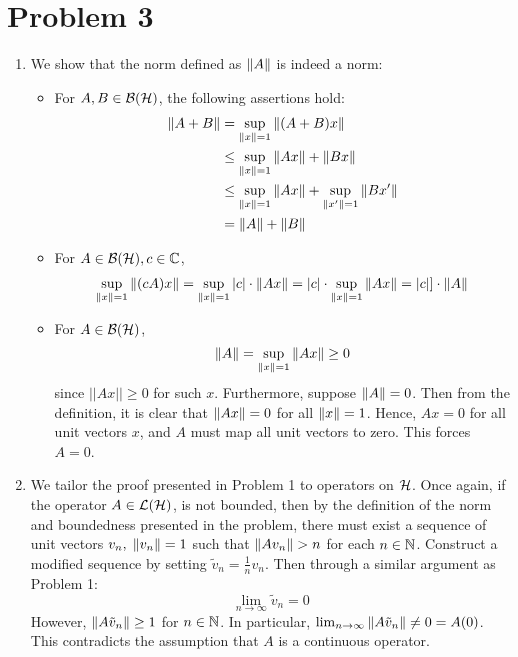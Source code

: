 \documentclass[12pt]{article}%
\begin{document}
\section*{Problem 3}
\begin{enumerate}[i]
  \item We show that the norm defined as $\norm{A}$ is indeed a norm:
  \begin{itemize}
    \item For $A,B \in \mathcal{B}(\mathcal{H})$, the following assertions hold:
    \begin{align*}
      \norm{A + B} & = \sup_{\norm{x} = 1} \norm{(A+B)x} \\
      & \leq \sup_{\norm{x} = 1} \norm{Ax} + \norm{Bx}\\
       & \leq \sup_{\norm{x} = 1} \norm{Ax} + \sup_{\norm{x'} = 1} \norm{Bx'} \\
       & = \norm{A} + \norm{B}
    \end{align*}
    \item For $A \in \mathcal{B}(\mathcal{H}), c \in {\mathbb{C}}$,
    \begin{align*}
      \sup_{\norm{x} = 1} \norm{(cA)x} = \sup_{\norm{x} = 1} \abs{c}\cdot \norm{Ax} = \abs{c}\cdot \sup_{\norm{x} = 1} \norm{Ax} = \abs{c}]\cdot \norm{A}
    \end{align*}

    \item  For $A \in \mathcal{B}(\mathcal{H})$,
    \[ \norm{A} = \sup_{\norm{x} = 1} \norm{Ax} \geq 0  \] since $||Ax|| \geq 0$ for such $x$. Furthermore, suppose $\norm{A} = 0$. Then from the definition, it is clear that $\norm{Ax} = 0$ for all $\norm{x} = 1$. Hence, $Ax = 0$ for all unit vectors $x$, and $A$ must map all unit vectors to zero. This forces $A = 0$.
  \end{itemize}

  \item We tailor the proof presented in Problem 1 to operators on $\mathcal{H}$. Once again, if the operator $A \in \mathcal{L}(\mathcal{H})$, is not bounded, then by the definition of the norm and boundedness presented in the problem, there must exist a sequence of unit vectors $v_n, \; \norm{v_n} = 1$  such that $\norm{Av_n} > n$ for each $n \in \mathbb{N}$. Construct a modified sequence by setting $\tilde{v}_n = \frac{1}{n}v_n$. Then through a similar argument as Problem 1:
  \[ \lim_{n \rightarrow \infty} \tilde{v}_n = 0 \] However, $\norm{A\tilde{v}_n} \geq 1$ for $n \in \mathbb{N}$. In particular,
  $\lim_{n \rightarrow \infty} \norm{A\tilde{v}_n} \neq 0 = A(0)$. This contradicts the assumption that $A$ is a continuous operator.


\end{enumerate}
\end{document}
